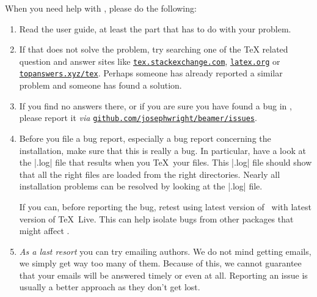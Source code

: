 When you need help with \beamer, please do the following:
\begin{enumerate}
\item
  Read the user guide, at least the part that has to do with your problem.
\item
  If that does not solve the problem, try searching one of the \TeX{} related question and answer sites like \href{https://tex.stackexchange.com}{\texttt{tex.stackexchange.com}}, \href{https://latex.org/forum/}{\texttt{latex.org}} or \href{https://topanswers.xyz/tex}{\texttt{topanswers.xyz/tex}}.
  Perhaps someone has already reported a similar problem and someone has found a solution.
\item
  If you find no answers there, or if you are sure you have found a bug in
  \beamer{}, please report it \emph{via} \href{https://github.com/josephwright/beamer/issues}{\texttt{github.com/josephwright/beamer/issues}}.
\item
  Before you file a bug report, especially a bug report concerning the installation, make sure that this is really a bug. In particular, have a look at the |.log| file that results when you \TeX\ your files. This |.log| file should show that all the right files are loaded from the right directories. Nearly all installation problems can be resolved by looking at the |.log| file.

  If you can, before reporting the bug, retest using latest version of \beamer\ with latest version of \TeX\ Live. This can help isolate bugs from other packages that might affect \beamer.
\item
  \emph{As a last resort} you can try emailing authors. We do not mind getting emails, we simply get way too many of them. Because of this, we cannot guarantee that your emails will be answered timely or even at all. Reporting
an issue is usually a better approach as they don't get lost.
\end{enumerate}
